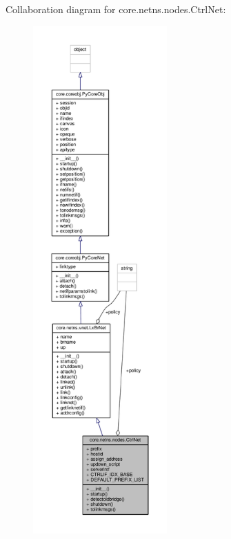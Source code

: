 Collaboration diagram for core.\+netns.\+nodes.\+Ctrl\+Net\+:
\nopagebreak
\begin{figure}[H]
\begin{center}
\leavevmode
\includegraphics[height=550pt]{classcore_1_1netns_1_1nodes_1_1_ctrl_net__coll__graph}
\end{center}
\end{figure}
